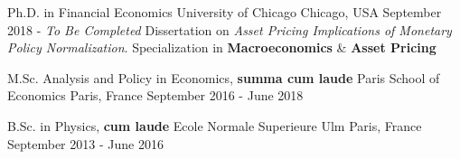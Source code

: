 

\begin{cventries}

	\cventry
	{Ph.D. in Financial Economics} %
	{University of Chicago} %
	{Chicago, USA} %
	{September 2018 - \textit{To Be Completed}} %
	{Dissertation on \textit{Asset Pricing Implications of Monetary Policy Normalization}. Specialization in \textbf{Macroeconomics} \& \textbf{Asset Pricing}}

	\cventry
	{M.Sc. Analysis and Policy in Economics, \textbf{summa cum laude}} %
	{Paris School of Economics} %
	{Paris, France} %
	{September 2016 - June 2018} %
	{}

	\cventry
	{B.Sc. in Physics, \textbf{cum laude}} %
	{Ecole Normale Superieure Ulm} %
	{Paris, France} %
	{September 2013 - June 2016} %
	{}

\end{cventries}
